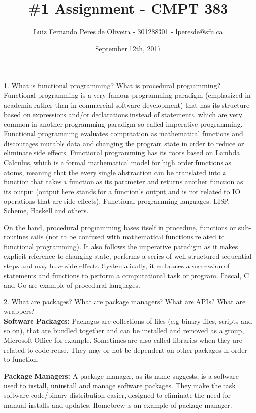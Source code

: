 \documentclass{article}
\title{\#1 Assignment - CMPT 383}
\author{Luiz Fernando Peres de Oliveira - 301288301 - lperesde@sfu.ca}
\date{September 12th, 2017}
\begin{document}
\maketitle

1. What is functional programming? What is procedural programming?
\\
\newline
Functional programming is a very famous programming paradigm (emphasized in academia rather than in commercial software development) that has its structure based on expressions and/or declarations instead of statements, which are very common in another programming paradigm so called imperative programming. Functional programming evaluates  computation as mathematical functions and discourages mutable data and changing the program state in order to reduce or eliminate side effects. Functional programming has its roots based on Lambda Calculus, which is a formal mathematical model for high order functions as atoms, meaning that the every single abstraction can be translated into a function that takes a function as its parameter and returns another function as its output (output here stands for a function's output and is not related to IO operations that are side effects). Functional programming languages: LISP, Scheme, Haskell and others. 


On the hand, procedural programming bases itself in procedure, functions or sub-routines calls (not to be confused with mathematical functions related to functional programming). It also follows the imperative paradigm as it makes explicit reference to changing-state, performs a series of well-structured sequential steps and may have side effects. Systematically, it embraces a succession of statements and functions to perform a computational task or program. Pascal, C and Go are example of procedural languages.
\newline

2. What are packages? What are package managers? What are APIs? What are wrappers?
\\

\textbf{Software Packages:} Packages are collections of files (e.g binary files, scripts and so on), that are bundled together and can be installed and removed as a group, Microsoft Office for example. Sometimes are also called libraries when they are related to code reuse. They may or not be dependent on other packages in order to function.

\textbf{Package Managers:} A package manager, as its name suggests, is a software used to install, uninstall and manage software packages. They make the task software code/binary distribution easier, designed to eliminate the need for manual installs and updates. Homebrew is an example of package manager.
\end{document}
